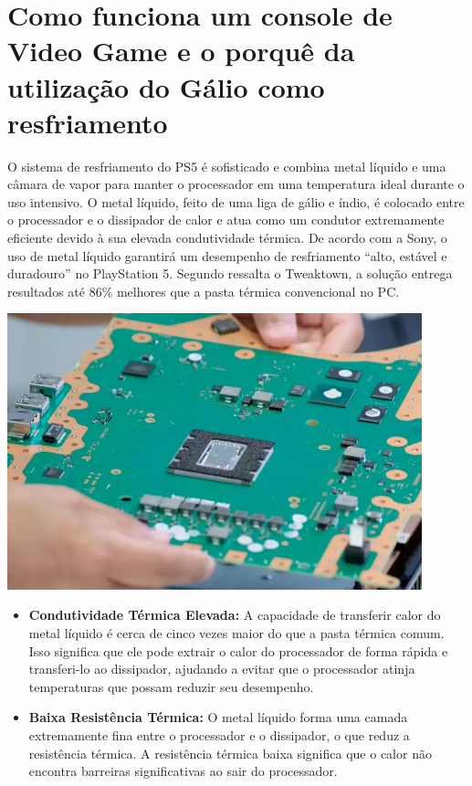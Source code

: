 \documentclass[12pt]{article}
\begin{document}
\section{Como funciona um console de Video Game e o porquê da utilização do Gálio como resfriamento}
O sistema de resfriamento do PS5 é sofisticado e combina metal líquido e uma câmara de vapor para manter o processador em uma temperatura ideal durante o uso intensivo. O metal líquido, feito de uma liga de gálio e índio, é colocado entre o processador e o dissipador de calor e atua como um condutor extremamente eficiente devido à sua elevada condutividade térmica.
De acordo com a Sony, o uso de metal líquido garantirá um desempenho de resfriamento “alto, estável e duradouro” no PlayStation 5. Segundo ressalta o Tweaktown, a solução entrega resultados até 86\% melhores que a pasta térmica convencional no PC.
\begin{adjustbox}{center,caption={O metal líquido garante melhor desempenho em comparação à pasta térmica. (Imagem: PlayStation/Reprodução)},nofloat=figure,vspace=\bigskipamount}
    \centering
    \includegraphics[width=12cm]{mobo.png}
\end{adjustbox}
\begin{itemize}
    \item \textbf{Condutividade Térmica Elevada:} A capacidade de transferir calor do metal líquido é cerca de cinco vezes maior do que a pasta térmica comum. Isso significa que ele pode extrair o calor do processador de forma rápida e transferi-lo ao dissipador, ajudando a evitar que o processador atinja temperaturas que possam reduzir seu desempenho.
    \item \textbf{Baixa Resistência Térmica:} O metal líquido forma uma camada extremamente fina entre o processador e o dissipador, o que reduz a resistência térmica. A resistência térmica baixa significa que o calor não encontra barreiras significativas ao sair do processador.
\end{itemize}
\end{document}
